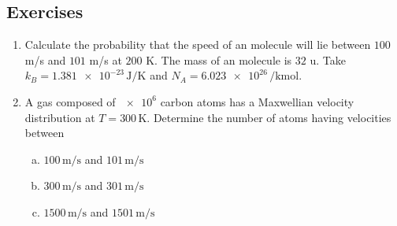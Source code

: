 	\subsection*{Exercises}
		\begin{enumerate}
			\item Calculate the probability that the speed of an  molecule will lie between $100$ m/s and $101$ m/s at $200$ K. The mass of an  molecule is $32$ u. Take $k_B=\num{1.381e-23}\,\unit{\joule\per\kelvin}$ and $N_A=\num{6.023e26}\,\unit{\per\kilo\mole}$.
			
			\item A gas composed of $\num{e6}$ carbon atoms has a Maxwellian velocity distribution at $T=300\,\unit{\kelvin}$. Determine the number of atoms having velocities between\vspace{-1.5ex}
			\begin{enumerate}[(a)]
				\item $100\,\unit{\metre\per\second}$ and $101\,\unit{\metre\per\second}$
				\item $300\,\unit{\metre\per\second}$ and $301\,\unit{\metre\per\second}$
				\item $1500\,\unit{\metre\per\second}$ and $1501\,\unit{\metre\per\second}$
			\end{enumerate}
		\end{enumerate}